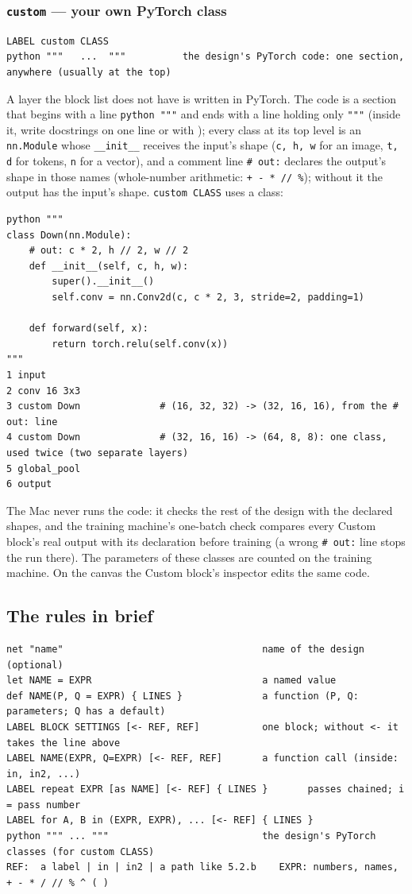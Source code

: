 \subsubsection*{\texttt{custom} --- your own PyTorch class}
\label{sec:custom-text}
\begin{Verbatim}[fontsize=\small]
LABEL custom CLASS
python """   ...  """          the design's PyTorch code: one section, anywhere (usually at the top)
\end{Verbatim}
A layer the block list does not have is written in PyTorch. The code is a section that begins with a line \texttt{python """} and
ends with a line holding only \texttt{"""} (inside it, write docstrings on one line or with \texttt{\textquotesingle\textquotesingle\textquotesingle});
every class at its top level is an \texttt{nn.Module} whose \texttt{\_\_init\_\_} receives the input's shape (\texttt{c, h, w} for an
image, \texttt{t, d} for tokens, \texttt{n} for a vector), and a comment line \texttt{\# out:} declares the output's shape in those names
(whole-number arithmetic: \texttt{+ - * // \%}); without it the output has the input's shape. \texttt{custom CLASS} uses a class:
\begin{verbatim}
python """
class Down(nn.Module):
    # out: c * 2, h // 2, w // 2
    def __init__(self, c, h, w):
        super().__init__()
        self.conv = nn.Conv2d(c, c * 2, 3, stride=2, padding=1)

    def forward(self, x):
        return torch.relu(self.conv(x))
"""
1 input
2 conv 16 3x3
3 custom Down              # (16, 32, 32) -> (32, 16, 16), from the # out: line
4 custom Down              # (32, 16, 16) -> (64, 8, 8): one class, used twice (two separate layers)
5 global_pool
6 output
\end{verbatim}
The Mac never runs the code: it checks the rest of the design with the declared shapes, and the training machine's one-batch check
compares every Custom block's real output with its declaration before training (a wrong \texttt{\# out:} line stops the run there). The
parameters of these classes are counted on the training machine. On the canvas the Custom block's inspector edits the same code.

\subsection{The rules in brief}
\begin{verbatim}
net "name"                                   name of the design (optional)
let NAME = EXPR                              a named value
def NAME(P, Q = EXPR) { LINES }              a function (P, Q: parameters; Q has a default)
LABEL BLOCK SETTINGS [<- REF, REF]           one block; without <- it takes the line above
LABEL NAME(EXPR, Q=EXPR) [<- REF, REF]       a function call (inside: in, in2, ...)
LABEL repeat EXPR [as NAME] [<- REF] { LINES }       passes chained; i = pass number
LABEL for A, B in (EXPR, EXPR), ... [<- REF] { LINES }
python """ ... """                           the design's PyTorch classes (for custom CLASS)
REF:  a label | in | in2 | a path like 5.2.b    EXPR: numbers, names, + - * / // % ^ ( )
\end{verbatim}

